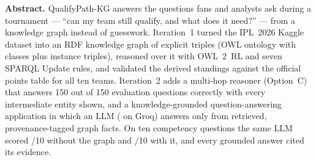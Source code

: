 \begin{titlepage}
\vfill
\begin{minipage}{0.92\linewidth}\small
\textbf{Abstract.} QualifyPath-KG answers the questions fans and analysts ask during a tournament ---
``can my team still qualify, and what does it need?'' --- from a knowledge graph instead of guesswork.
Iteration~1 turned the IPL~2026 Kaggle dataset into an RDF knowledge graph of \statExplicit{} explicit
triples (OWL ontology with \statClasses{} classes plus \statAbox{} instance triples), reasoned over it with
OWL~2~RL and seven SPARQL Update rules, and validated the derived standings against the official points table
for all ten teams. Iteration~2 adds a multi-hop reasoner (Option~C) that answers 150 out of 150 evaluation
questions correctly with every intermediate entity shown, and a knowledge-grounded question-answering
application in which an LLM (\evalModel{} on Groq) answers only from retrieved, provenance-tagged graph facts.
On ten competency questions the same LLM scored \evalA/10 without the graph and \evalB/10 with it, and every
grounded answer cited its evidence.
\end{minipage}
\vspace{0.4cm}
\end{titlepage}
